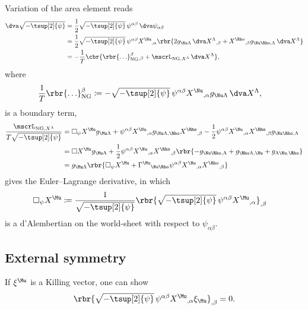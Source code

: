 \documentclass[a4paper,11pt]{article}
\begin{document}
Variation of the area element reads
\begin{align}
\dva \sqrt{-\tsup[2]{\psi}} &=
\frac{1}{2} \sqrt{-\tsup[2]{\psi}}\, \psi^{\alpha\beta}\,
\dva \psi_{\alpha\beta}
\nonumber \\
&=
\frac{1}{2} \sqrt{-\tsup[2]{\psi}}\, \psi^{\alpha\beta}
X^{\Nu}{}_{,\alpha}\rbr{2 g_{\Nu\Lambda}\, \dva X^{\Lambda}{}_{,\beta} + 
	X^{\Rho}{}_{,\beta} g_{\Nu\Rho,\Lambda}\, \dva X^{\Lambda}}
\nonumber \\
&=
-\frac{1}{T} \cbr{ \rbr{\ldots}_\text{NG}^{\beta}{}_{,\beta} +
	\mscrL_{\text{NG}, X^{\Lambda}}\,\dva X^\Lambda},
\end{align}
where
\begin{align}
\frac{1}{T} \rbr{\ldots}_\text{NG}^{\beta} &\coloneqq 
-\sqrt{-\tsup[2]{\psi}}\, 
\psi^{\alpha\beta} X^{\Nu}{}_{,\alpha} g_{\Nu\Lambda}\,\dva X^{\Lambda},
\end{align}
is a boundary term,
\begin{align}
\frac{\mscrL_{\text{NG}, X^{\Lambda}}}{T\sqrt{-\tsup[2]{\psi}}} &=
	\square_\psi X^{\Mu} g_{\Mu\Lambda} + 
	\psi^{\alpha\beta} X^{\Nu}{}_{,\alpha}
		g_{\Nu\Lambda,\Rho} X^{\Rho}{}_{,\beta} -
	\frac{1}{2} \psi^{\alpha\beta} X^{\Nu}{}_{,\alpha} X^{\Rho}{}_{,\beta}
		g_{\Nu\Rho,\Lambda}
\nonumber \\
&=
\square X^{\Mu} g_{\Mu\Lambda} + 
\frac{1}{2} \psi^{\alpha\beta} X^{\Nu}{}_{,\alpha} X^{\Rho}{}_{,\beta}
	\rbr{-g_{\Nu\Rho,\Lambda} + g_{\Rho\Lambda,\Nu} + g_{\Lambda\Nu,\Rho}}
\nonumber \\
&=
g_{\Mu\Lambda} \rbr{\square_\psi X^{\Mu} + \Gamma^{\Mu}{}_{\Nu\Rho} 
\psi^{\alpha\beta} X^{\Nu}{}_{,\alpha} X^{\Rho}{}_{,\beta}}
\end{align}
gives the Euler--Lagrange derivative, in which
\begin{align}
\square_\psi X^{\Mu} &\coloneqq
\frac{1}{\sqrt{-\tsup[2]{\psi}}} \rbr{\sqrt{-\tsup[2]{\psi}}\, 
	\psi^{\alpha\beta} X^{\Mu}{}_{,\alpha}}_{,\beta}
\end{align}
is a d'Alembertian on the world-sheet with respect to $\psi_{\alpha\beta}$.


\subsection{External symmetry}
\label{sec:bos-str-ext-sym}

If $\xi^\Mu$ is a Killing vector, one can show
\begin{align}
	\rbr{\sqrt{-\tsup[2]{\psi}}\, \psi^{\alpha\beta}
		X^{\Mu}{}_{,\alpha} \xi_{\Mu}}_{,\beta} = 0.
\end{align}
\end{document}
